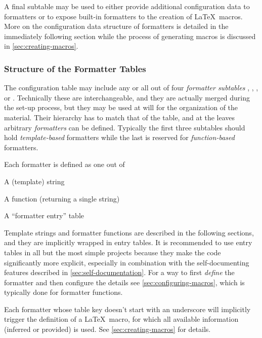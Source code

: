 \documentclass{scrartcl}
\begin{document}
A final subtable  may be used to either provide additional
configuration data to formatters or to expose built-in formatters to the
creation of \LaTeX\ macros.  More on the configuration data structure of
formatters is detailed in the immediately following section while the process of
generating macros is discussed in \vref{sec:creating-macros}.


\subsubsection{Structure of the Formatter Tables}
\label{sec:structure-of-formatter-tables}

The configuration table may include any or all out of four \emph{formatter
subtables} , , , or
.  Technically these are interchangeable, and they are
actually merged during the set-up process, but they may be used at will for the
organization of the material.  Their hierarchy has to match that of the
 table, and at the leaves arbitrary \emph{formatters} can be
defined.  Typically the first three subtables should hold \emph{template-based}
formatters while the last is reserved for \emph{function-based} formatters.

Each formatter is defined as one out of

\begin{itemize*}
\item A (template) string
\item A function (returning a single string)
\item A “formatter entry” table
\end{itemize*}

Template strings and formatter functions are described in the following
sections, and they are implicitly wrapped in entry tables.  It is recommended to
use entry tables in all but the most simple projects because they make the code
significantly more explicit, especially in combination with the self-documenting
features described in \vref{sec:self-documentation}.  For a way to first
\emph{define} the formatter and then configure the details see
\vref{sec:configuring-macros}, which is typically done for formatter functions.

Each formatter whose table key doesn't start with an underscore will implicitly
trigger the definition of a \LaTeX\ macro, for which all available information
(inferred or provided) is used.  See \vref{sec:creating-macros} for
details.
\end{document}

